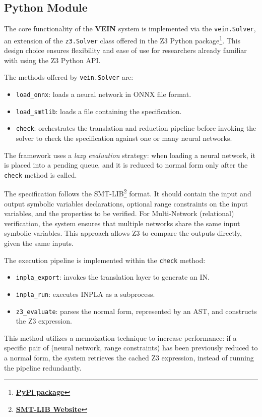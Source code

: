 \subsection{Python Module}
\label{sec:python-module}

The core functionality of the \textbf{VEIN} system is implemented via the \texttt{vein.Solver}, an extension of
the \texttt{z3.Solver} class offered in the Z3 Python
package\footnote{\href{https://pypi.org/project/z3-solver}{\textbf{PyPi package}}}. This design choice
ensures flexibility and ease of use for researchers already familiar with using the Z3 Python API.

The methods offered by \texttt{vein.Solver} are:
\begin{itemize}
	\item \texttt{load\_onnx}: loads a neural network in ONNX file format.
	\item \texttt{load\_smtlib}: loads a file containing the specification.
	\item \texttt{check}: orchestrates the translation and reduction pipeline before invoking the
		solver to check the specification against one or many neural networks.
\end{itemize}

The framework uses a \textit{lazy evaluation} strategy: when loading a neural network, it is placed
into a pending queue, and it is reduced to normal form only after the \texttt{check} method is
called.

The specification follows the SMT-LIB\footnote{\href{https://smt-lib.org}{\textbf{SMT-LIB Website}}}
format. It should contain the input and output symbolic variables declarations, optional range
constraints on the input variables, and the properties to be verified. For Multi-Network (relational)
verification, the system ensures that multiple networks share the same input symbolic variables.
This approach allows Z3 to compare the outputs directly, given the same inputs.

The execution pipeline is implemented within the \texttt{check} method:
\begin{itemize}
	\item \texttt{inpla\_export}: invokes the translation layer to generate an IN.
	\item \texttt{inpla\_run}: executes INPLA as a subprocess.
	\item \texttt{z3\_evaluate}: parses the normal form, represented by an AST, and constructs the
		Z3 expression.
\end{itemize}
This method utilizes a memoization technique to increase performance: if a specific pair of (neural
network, range constraints) has been previously reduced to a normal form, the system retrieves the
cached Z3 expression, instead of running the pipeline redundantly.
